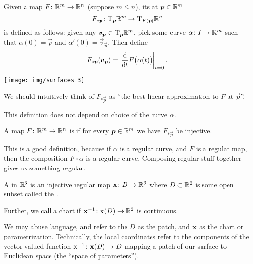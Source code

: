 \begin{definition}
Given a map $F\colon \mathbb{R}^{m}\to\mathbb{R}^{n}$ (suppose $m\leq n$), its
 at $\boldsymbol{p}\in\mathbb{R}^{m}$
\begin{equation*}
F_{*\boldsymbol{p}}\colon\mathrm{T}_{\boldsymbol{p}}\mathbb{R}^{m}\to\mathrm{T}_{F(\boldsymbol{p})}\mathbb{R}^{n}
\end{equation*}
is defined as follows: given any $\boldsymbol{v}_{\boldsymbol{p}}\in\mathrm{T}_{\boldsymbol{p}}\mathbb{R}^{m}$,
pick some curve $\alpha\colon I\to\mathbb{R}^{m}$ such that $\alpha(0)=\vec{p}$
and $\alpha'(0) = \vec{v}_{\vec{p}}$. Then define
\begin{equation}
F_{*\boldsymbol{p}}(\boldsymbol{v}_{\boldsymbol{p}}) = \left.\frac{\mathrm{d}}{\mathrm{d} t}F\bigl(\alpha(t)\bigr)\right|_{t=0}.
\end{equation}
\begin{center}
  \texttt{[image: img/surfaces.3]}
\end{center}
\end{definition}

\begin{remark}
We should intuitively think of $F_{*\vec{p}}$ as ``the best linear
approximation to $F$ at $\vec{p}$''.
\end{remark}

\begin{remark}
This definition does not depend on choice of the curve $\alpha$.
\end{remark}

\begin{definition}
A map $F\colon\mathbb{R}^{m}\to\mathbb{R}^{n}$ is  if for every
$\boldsymbol{p}\in\mathbb{R}^{m}$ we have $F_{*\vec{p}}$ be injective.
\end{definition}

\begin{remark}
This is a good definition, because if $\alpha$ is a regular curve, and
$F$ is a regular map, then the composition $F\circ\alpha$ is a regular
curve. Composing regular stuff together gives us something regular.
\end{remark}

\begin{definition}
A  in $\mathbb{R}^{3}$ is an injective regular map
$\mathbf{x}\colon D\to\mathbb{R}^{3}$ where $D\subset\mathbb{R}^{2}$ is some open
subset called the .

Further, we call a chart  if $\mathbf{x}^{-1}\colon\mathbf{x}(D)\to\mathbb{R}^{2}$
is continuous.

We may abuse language, and refer to the $D$ as the patch, and
$\mathbf{x}$ as the chart or parametrization. Technically, the local
coordinates refer to the components of the vector-valued function
$\mathbf{x}^{-1}\colon\mathbf{x}(D)\to D$ mapping a patch of our surface
to Euclidean space (the ``space of parameters'').
\end{definition}

